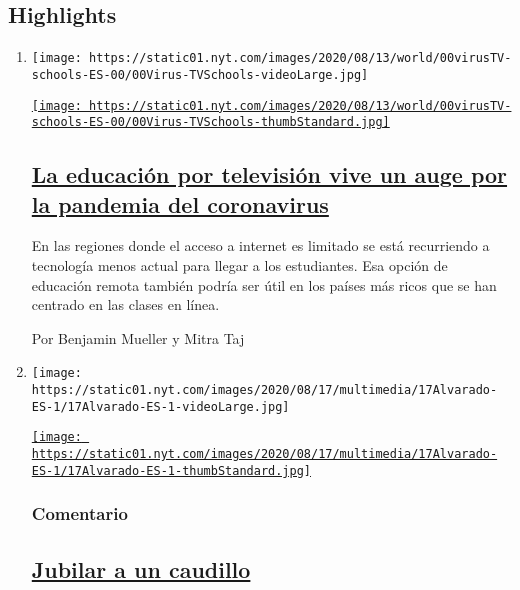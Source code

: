 \hypertarget{highlights}{%
\subsection{Highlights}\label{highlights}}

\begin{enumerate}
\def\labelenumi{\arabic{enumi}.}
\item
  \texttt{[image: https://static01.nyt.com/images/2020/08/13/world/00virusTV-schools-ES-00/00Virus-TVSchools-videoLarge.jpg]}

  \href{/es/2020/08/17/espanol/educacion-television.html}{\texttt{[image: https://static01.nyt.com/images/2020/08/13/world/00virusTV-schools-ES-00/00Virus-TVSchools-thumbStandard.jpg]}}

  \hypertarget{la-educaciuxf3n-por-televisiuxf3n-vive-un-auge-por-la-pandemia-del-coronavirus}{%
  \subsection{\texorpdfstring{\href{/es/2020/08/17/espanol/educacion-television.html}{La
  educación por televisión vive un auge por la pandemia del
  coronavirus}}{La educación por televisión vive un auge por la pandemia del coronavirus}}\label{la-educaciuxf3n-por-televisiuxf3n-vive-un-auge-por-la-pandemia-del-coronavirus}}

  En las regiones donde el acceso a internet es limitado se está
  recurriendo a tecnología menos actual para llegar a los estudiantes.
  Esa opción de educación remota también podría ser útil en los países
  más ricos que se han centrado en las clases en línea.

  Por Benjamin Mueller y Mitra Taj
\item
  \texttt{[image: https://static01.nyt.com/images/2020/08/17/multimedia/17Alvarado-ES-1/17Alvarado-ES-1-videoLarge.jpg]}

  \href{/es/2020/08/17/espanol/opinion/alvaro-uribe-colombia.html}{\texttt{[image: https://static01.nyt.com/images/2020/08/17/multimedia/17Alvarado-ES-1/17Alvarado-ES-1-thumbStandard.jpg]}}

  \hypertarget{comentario}{%
  \subsubsection{Comentario}\label{comentario}}

  \hypertarget{jubilar-a-un-caudillo}{%
  \subsection{\texorpdfstring{\href{/es/2020/08/17/espanol/opinion/alvaro-uribe-colombia.html}{Jubilar
  a un caudillo}}{Jubilar a un caudillo}}\label{jubilar-a-un-caudillo}}


\end{enumerate}
